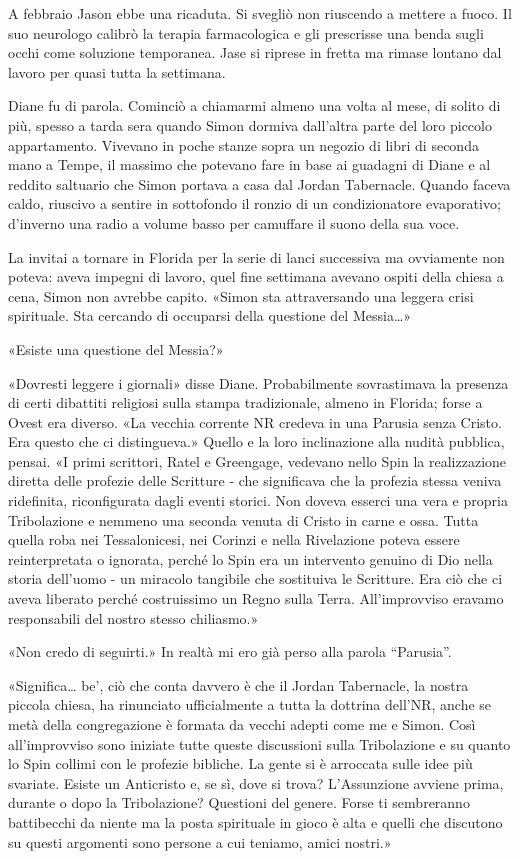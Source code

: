 \separatorefiori

A febbraio Jason ebbe una ricaduta. Si svegliò non riuscendo a mettere a
fuoco. Il suo neurologo calibrò la terapia farmacologica e gli
prescrisse una benda sugli occhi come soluzione temporanea. Jase si
riprese in fretta ma rimase lontano dal lavoro per quasi tutta la
settimana.

Diane fu di parola. Cominciò a chiamarmi almeno una volta al mese, di
solito di più, spesso a tarda sera quando Simon dormiva dall'altra parte
del loro piccolo appartamento. Vivevano in poche stanze sopra un negozio
di libri di seconda mano a Tempe, il massimo che potevano fare in base
ai guadagni di Diane e al reddito saltuario che Simon portava a casa dal
Jordan Tabernacle. Quando faceva caldo, riuscivo a sentire in sottofondo
il ronzio di un condizionatore evaporativo; d'inverno una radio a volume
basso per camuffare il suono della sua voce.

La invitai a tornare in Florida per la serie di lanci successiva ma
ovviamente non poteva: aveva impegni di lavoro, quel fine settimana
avevano ospiti della chiesa a cena, Simon non avrebbe capito. «Simon sta
attraversando una leggera crisi spirituale. Sta cercando di occuparsi
della questione del Messia\ldots»

«Esiste una questione del Messia?»

«Dovresti leggere i giornali» disse Diane. Probabilmente sovrastimava la
presenza di certi dibattiti religiosi sulla stampa tradizionale, almeno
in Florida; forse a Ovest era diverso. «La vecchia corrente NR credeva
in una Parusia senza Cristo. Era questo che ci distingueva.» Quello e la
loro inclinazione alla nudità pubblica, pensai. «I primi scrittori,
Ratel e Greengage, vedevano nello Spin la realizzazione diretta delle
profezie delle Scritture - che significava che la profezia stessa veniva
ridefinita, riconfigurata dagli eventi storici. Non doveva esserci una
vera e propria Tribolazione e nemmeno una seconda venuta di Cristo in
carne e ossa. Tutta quella roba nei Tessalonicesi, nei Corinzi e nella
Rivelazione poteva essere reinterpretata o ignorata, perché lo Spin era
un intervento genuino di Dio nella storia dell'uomo - un miracolo
tangibile che sostituiva le Scritture. Era ciò che ci aveva liberato
perché costruissimo un Regno sulla Terra. All'improvviso eravamo
responsabili del nostro stesso chiliasmo.»

«Non credo di seguirti.» In realtà mi ero già perso alla parola
``Parusia''.

«Significa\ldots{} be', ciò che conta davvero è che il Jordan
Tabernacle, la nostra piccola chiesa, ha rinunciato ufficialmente a
tutta la dottrina dell'NR, anche se metà della congregazione è formata
da vecchi adepti come me e Simon. Così all'improvviso sono iniziate
tutte queste discussioni sulla Tribolazione e su quanto lo Spin collimi
con le profezie bibliche. La gente si è arroccata sulle idee più
svariate. Esiste un Anticristo e, se sì, dove si trova? L'Assunzione
avviene prima, durante o dopo la Tribolazione? Questioni del genere.
Forse ti sembreranno battibecchi da niente ma la posta spirituale in
gioco è alta e quelli che discutono su questi argomenti sono persone a
cui teniamo, amici nostri.»

